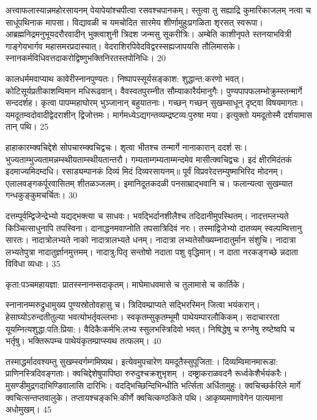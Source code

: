 अत्त्वाफलास्यान्नमहोरसायनम् पेयापेयांश्चपीत्वा रसवश्चपानकम्।
स्तुत्वा तु सह्याद्रि कुमारिकाजलम् नत्वा च साधूंपथिनाक मापसा।
विद्यावळी च यमचोदित सारमेय शीर्णामुहुःप्रगळिता शृरसत् स्वरूपा।
आब्रह्मनिद्रमनुभूयदरौरवादीन् भुक्त्वाशुनी त्रिदश जन्मसु सूकरीत्रिः।
अम्बेति काशीनृपते स्तनयाभवित्री गाङ्गेयभार्गव महासमरप्रदास्यात्।
वेदराशिरपिवेदविद्वरस्सह्यजापयसि तौलिमासके।
स्नानकर्मविधिवत्तदाकरोद्विष्णुभक्तिनिरतस्तपोनिधिः।
20

कालधर्ममवाप्याथ कावेरीस्नानपुण्यतः।
निष्पापस्सूर्यसङ्काश: शुद्धान्त:करणो भवत्।
कोटिसूर्यप्रतीकाशम्विमान मधिरूढवान्।
वैवस्वतपुरम्नीत सौम्याकारैर्यमानुगैः।
पुण्यपापफलम्भोक्रुम्स्तन्मार्गे सन्ददर्शह।
कृत्वा पापम्महाघोरम् भुञ्जानान् बहुयातनाः।
गच्छन् गच्छन् सुखम्साधून् दृष्ट्वा विषयमागतः।
यमदूतम्वदोवादीद्वेदराशीन् द्विजोत्तमः।
मार्गमध्येऽद्यगन्तव्यम्द्रष्टव्य:पुरुषा मया।
इत्युक्तो यमदूतोस्मै दर्शयामास तान् पथि।
25



हाहाकारम्क्वचिद्देशे सोपचारम्क्वचिद्वचः।
शृत्वा भीतश्च तन्मार्गे नानाकारान् ददर्श सः।
भुज्यताम्भुज्यतामन्नम्स्थीयताम्स्थीयतान्तरौ।
गम्यताम्गम्यताम्मन्दमेव मासीत्क्वचिद्वचः।
इदं क्षीरमिदंतकं इदमाज्यमिदम्दधि।
रसाड्यम्पानकं दिव्यं मिदं दिव्यरसायनम्॥ पूर्वं विप्रवरेदत्तम्युष्माभिरिद मोदनम्।
एलालवङ्गकर्पूरवासितम् शीतळञ्जलम्।
इमानिदूतकदळी पनसाम्राद्भवानि च।
फलान्यत्वा सुखम्यात गन्धकुङ्कुमचर्चितः।
30

दत्तम्पूर्वम्द्विजेन्द्रेभ्यो यद्यद्भक्त्या च साधवः।
भवद्भिर्दानशीलैश्च तदिदानीमुपस्थितम्।
नादत्तम्लभ्यते किञ्चित्साधुनापि तपस्विना।
दानाद्धनमवाप्नोति तपसात्रिदिवं नरः।
तस्माद्विजेभ्यो दातव्यम् स्वल्पम्वित्तानु सारतः।
नादात्रोलभ्यते नाको नादात्रालभ्यते धनम्।
नादात्रा लभ्यतेसौख्यम्नादातुर्मान संशुचि।
नादात्रा लभ्यतेपुत्रा नादातुर्ज्ञानमुत्तमम्।
नादात्रु:पितृ सन्तोषो नदाता पशु वृद्धिमान्।
न दाता नरकङ्गच्छे न्नदाता विविधा व्यधाः।
35

कृता:पञ्चमहायज्ञा: प्रातस्स्नानम्सदाकृतम्।
माघेमाधवमासे च तुलामासे च कार्तिके।


स्नानानम्मरुद्रुधामुख्य पुण्यस्रोतोवहासु च।
त्रिदिवम्प्राप्यते सद्भिरस्मिन् जित्वा भयंकरान्।
हेसाघ्योऽरुन्दतीतुल्या भवत्योभर्तृवल्लभाः।
स्वकृतम्सुकृतम्भूमौ पाथेयम्पारलौकिकम्।
सदाचाररता यूयम्नित्यशुद्धा:पति:प्रिया:।
वैदिकैःकर्मभि:लभ्य स्सुलभस्त्रिदिवो भवत्।
निषिद्धेषु च रुग्नेषु रुष्टेष्वपि च भर्तृषु।
भक्तिरूपम्च पाथेयंकृतम्प्राप्स्यथ तत्फलम्।
40

तस्माद्धर्मादवश्यम्तु सुखम्स्वर्गम्गमिष्यथ।
इत्येवमुपचारेण यमदूतैस्सुपूजिता:।
दिव्यम्विमानमारूडा: प्राणिनस्त्रिदिवङ्गताः।
क्वचिद्देशेषुपापिष्ठा रुरुदुश्चक्रशुभृशम् ।
दम्ष्ट्राकराळवदनै रूर्ध्वकेशैर्भयंकरैः।
मुसण्डीमुद्रगदाभिण्डिवालासि दारिभिः।
वदद्भिच्छिन्दिभिन्धीति भर्त्सिता अर्धितामुहुः।
क्वचिच्छर्करिले मार्गे क्वचित्सन्तप्तवालुके।
तप्तायश्चङ्कभि:कीर्णे क्वचित्कण्ठकिते पथि।
आकृष्यमाणावेगेन पात्यमाना अधोमुखम्।
45

